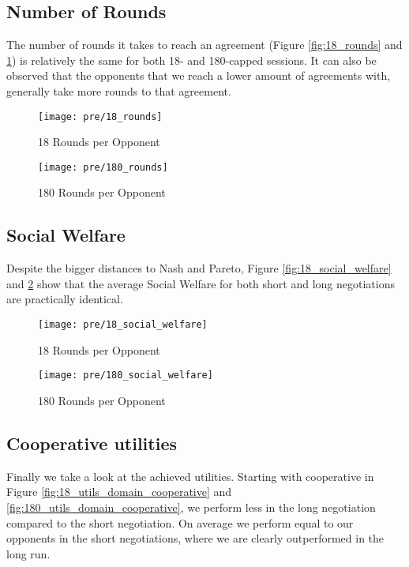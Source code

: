 \subsection{Number of Rounds}

The number of rounds it takes to reach an agreement (Figure \ref{fig:18_rounds} and \ref{fig:180_rounds}) is relatively the same for both 18- and 180-capped sessions. It can also be observed that the opponents that we reach a lower amount of agreements with, generally take more rounds to that agreement.\\

\begin{figure}[!htb]
	\texttt{[image: pre/18\_rounds]}
	\caption{18 Rounds per Opponent}
	\label{fig:18_rounds}
	\endminipage\hfill
	\texttt{[image: pre/180\_rounds]}
	\caption{180 Rounds per Opponent}
	\label{fig:180_rounds}
	\endminipage\hfill
\end{figure}

\subsection{Social Welfare}

Despite the bigger distances to Nash and Pareto, Figure \ref{fig:18_social_welfare} and \ref{fig:180_social_welfare} show that the average Social Welfare for both short and long negotiations are practically identical. \\

\begin{figure}[!htb]
	\texttt{[image: pre/18\_social\_welfare]}
	\caption{18 Rounds per Opponent}
	\label{fig:18_social_welfare}
	\endminipage\hfill
	\texttt{[image: pre/180\_social\_welfare]}
	\caption{180 Rounds per Opponent}
	\label{fig:180_social_welfare}
	\endminipage\hfill
\end{figure}

\subsection{Cooperative utilities}

Finally we take a look at the achieved utilities. Starting with cooperative in Figure \ref{fig:18_utils_domain_cooperative} and \ref{fig:180_utils_domain_cooperative}, we perform less in the long negotiation compared to the short negotiation. On average we perform equal to our opponents in the short negotiations, where we are clearly outperformed in the long run.\\

